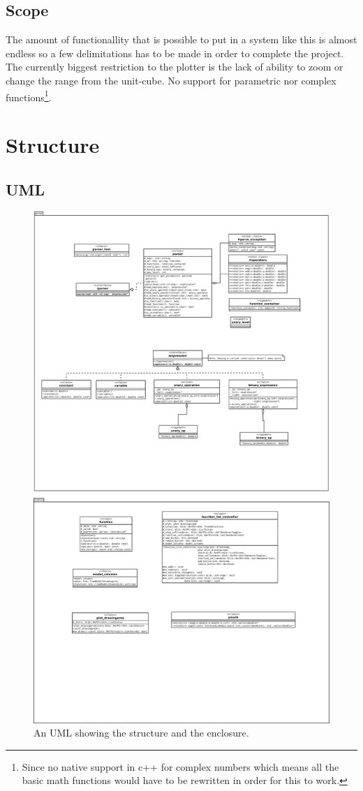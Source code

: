 \documentclass[a4paper,11pt]{kth-mag}
\begin{document}
\section{Scope}
\label{sec:scope}
The amount of functionallity that is possible to put in a system like this is almost endless so a few delimitations has to be made in order to complete the project.
The currently biggest restriction to the plotter is the lack of ability to zoom or change the range from the unit-cube.
No support for parametric nor complex functions\footnote{Since no native support in c++ for complex numbers which means all the basic math functions would have to be rewritten in order for this to work.}.

\chapter{Structure}

\section{UML}
\begin{figure}[ht]
    \begin{center}
        \includegraphics[width=\textwidth]{uml.pdf}
        \caption{\small{An UML showing the structure and the enclosure.}}\label{fig:UML}
    \end{center}
\end{figure}
\end{document}
